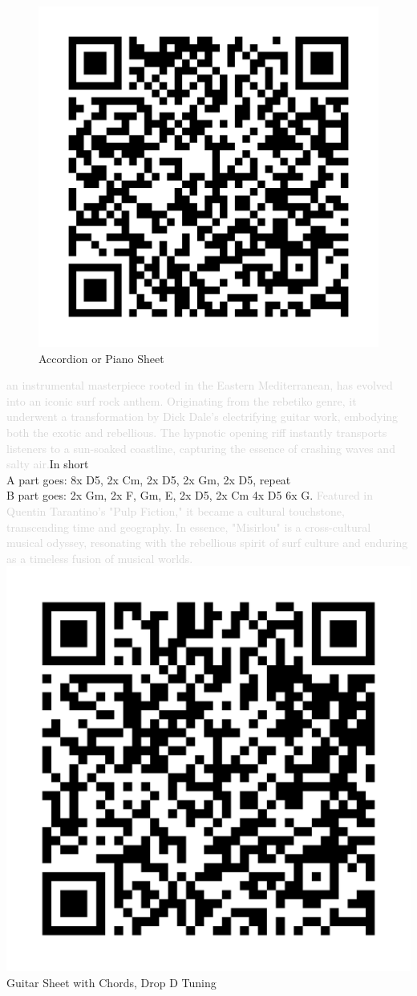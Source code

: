 \begin{figure}
\includegraphics[width=1\linewidth]{QR_Codes/QR_Miserlou_Accordion.png}\\
Accordion or Piano Sheet
\end{figure}

\textcolor{lightgray}{an instrumental masterpiece rooted in the Eastern Mediterranean, has evolved into an iconic surf rock anthem. Originating from the rebetiko genre, it underwent a transformation by Dick Dale's electrifying guitar work, embodying both the exotic and rebellious. The hypnotic opening riff instantly transports listeners to a sun-soaked coastline, capturing the essence of crashing waves and salty air.}In short\\
A part goes: 8x D5, 2x Cm, 2x D5, 2x Gm, 2x D5, repeat\\
B part goes: 2x Gm, 2x F, Gm, E, 2x D5, 2x Cm 4x D5 6x G. \textcolor{lightgray}{Featured in Quentin Tarantino's "Pulp Fiction," it became a cultural touchstone, transcending time and geography. In essence, "Misirlou" is a cross-cultural musical odyssey, resonating with the rebellious spirit of surf culture and enduring as a timeless fusion of musical worlds.}\\

\includegraphics[width=0.2\linewidth]{QR_Codes/QR_Miserlou_Guitar.png}\\
Guitar Sheet with Chords, Drop D Tuning
